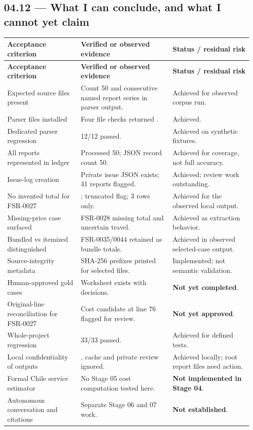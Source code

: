 \documentclass[11pt,a4paper]{article}
\DeclareRobustCommand{\code}[1]{{\ttfamily\small\detokenize{#1}}}
\begin{document}
\subsection{04.12 --- What I can conclude, and what I cannot yet claim}
\begin{longtable}{@{}L{52mm}L{47mm}L{50mm}@{}}
\toprule
\textbf{Acceptance criterion} & \textbf{Verified or observed evidence} & \textbf{Status / residual risk}\\
\midrule\endfirsthead
\toprule
\textbf{Acceptance criterion} & \textbf{Verified or observed evidence} & \textbf{Status / residual risk}\\
\midrule\endhead
Expected source files present & Count 50 and consecutive named report series in parser output. & Achieved for observed corpus run.\\
Parser files installed & Four file checks returned \code{True}. & Achieved.\\
Dedicated parser regression & 12/12 passed. & Achieved on synthetic fixtures.\\
All reports represented in ledger & Processed 50; JSON record count 50. & Achieved for coverage, not full accuracy.\\
Issue-log creation & Private issue JSON exists; 41 reports flagged. & Achieved; review work outstanding.\\
No invented total for FSR-0027 & \code{reported_total=None}; truncated flag; 3 rows only. & Achieved for the observed local output.\\
Missing-price case surfaced & FSR-0028 missing total and uncertain travel. & Achieved as extraction behavior.\\
Bundled vs itemized distinguished & FSR-0035/0044 retained as bundle totals. & Achieved in observed selected-case output.\\
Source-integrity metadata & SHA-256 prefixes printed for selected files. & Implemented; not semantic validation.\\
Human-approved gold cases & Worksheet exists with \code{Pending} decisions. & \textbf{Not yet completed}.\\
Original-line reconciliation for FSR-0027 & Cost candidate at line 76 flagged for review. & \textbf{Not yet approved}.\\
Whole-project regression & 33/33 passed. & Achieved for defined tests.\\
Local confidentiality of outputs & \code{raw/}, cache and private review ignored. & Achieved locally; root report files need action.\\
Formal Chile service estimator & No Stage 05 cost computation tested here. & \textbf{Not implemented in Stage 04}.\\
Autonomous conversation and citations & Separate Stage 06 and 07 work. & \textbf{Not established}.\\
\bottomrule
\end{longtable}
\end{document}
